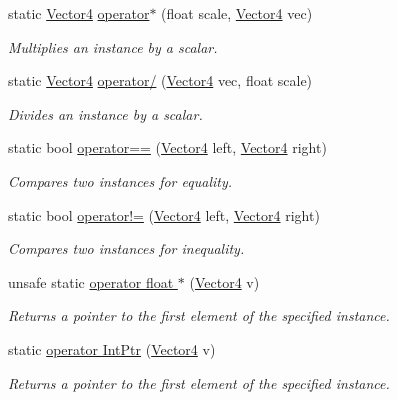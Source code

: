 \begin{DoxyCompactItemize}
static \hyperlink{struct_open_t_k_1_1_vector4}{Vector4} \hyperlink{struct_open_t_k_1_1_vector4_ae060f0f62dd03aa84a3195ae63b25414}{operator$\ast$} (float scale, \hyperlink{struct_open_t_k_1_1_vector4}{Vector4} vec)
\begin{DoxyCompactList}\small\item\em Multiplies an instance by a scalar. \end{DoxyCompactList}\item 
static \hyperlink{struct_open_t_k_1_1_vector4}{Vector4} \hyperlink{struct_open_t_k_1_1_vector4_a53f01b1b4c5738bf7d23a1ffa758503b}{operator/} (\hyperlink{struct_open_t_k_1_1_vector4}{Vector4} vec, float scale)
\begin{DoxyCompactList}\small\item\em Divides an instance by a scalar. \end{DoxyCompactList}\item 
static bool \hyperlink{struct_open_t_k_1_1_vector4_abfde8dd6cef5ce616795511c9e618697}{operator==} (\hyperlink{struct_open_t_k_1_1_vector4}{Vector4} left, \hyperlink{struct_open_t_k_1_1_vector4}{Vector4} right)
\begin{DoxyCompactList}\small\item\em Compares two instances for equality. \end{DoxyCompactList}\item 
static bool \hyperlink{struct_open_t_k_1_1_vector4_a70fc63e29dd9949fe209085a7ab7746f}{operator!=} (\hyperlink{struct_open_t_k_1_1_vector4}{Vector4} left, \hyperlink{struct_open_t_k_1_1_vector4}{Vector4} right)
\begin{DoxyCompactList}\small\item\em Compares two instances for inequality. \end{DoxyCompactList}\item 
unsafe static \hyperlink{struct_open_t_k_1_1_vector4_a6cf7b4bbdbbe92787b134684bbd9a852}{operator float $\ast$} (\hyperlink{struct_open_t_k_1_1_vector4}{Vector4} v)
\begin{DoxyCompactList}\small\item\em Returns a pointer to the first element of the specified instance. \end{DoxyCompactList}\item 
static \hyperlink{struct_open_t_k_1_1_vector4_acd9853f99ad16e25ee3f7b4327891035}{operator Int\-Ptr} (\hyperlink{struct_open_t_k_1_1_vector4}{Vector4} v)
\begin{DoxyCompactList}\small\item\em Returns a pointer to the first element of the specified instance. \end{DoxyCompactList}\end{DoxyCompactItemize}
